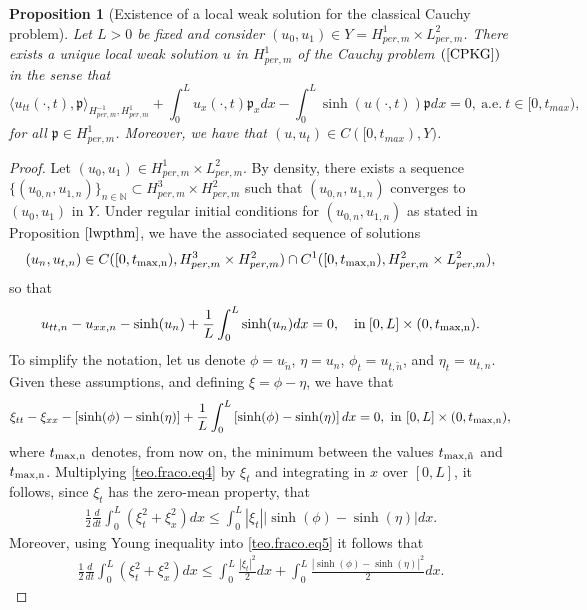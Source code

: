 \documentclass[12pt,reqno,a4paper]{amsart} %
\numberwithin{equation}{section}
\numberwithin{figure}{section}
\newtheorem{proposition}[theorem]{Proposition}
\begin{document}
\begin{proposition}[Existence of a local weak solution for the classical Cauchy problem]\label{lwpthm2}	
	Let $L>0$ be fixed and consider $(u_0,u_1)\in Y=H_{per,m}^1\times L_{per,m}^2$. There exists a unique local weak solution $u$ in $H_{per,m}^1$ of the Cauchy problem $(\ref{CPKG})$ in the sense that 
	\begin{equation}\label{weaksol}
	\displaystyle	\langle u_{tt}(\cdot,t), \mathfrak{p}	\displaystyle\rangle_{H^{-1}_{per,m},H_{per,m}^1} + \int_{0}^{L} u_x(\cdot,t)\mathfrak{p}_xdx - \int_{0}^{L} \sinh(u(\cdot,t))\mathfrak{p}dx = 0, \ \text{a.e.} \ t \in [0,t_{max}),
	\end{equation}for all $\mathfrak{p}\in H_{per,m}^1$. Moreover, we have that $(u,u_t)\in C([0,t_{max}),Y)$.
\end{proposition}
\begin{proof} Let $(u_0,u_1)\in H_{per,m}^1\times L_{per,m}^2$. By density, there exists a sequence $\{ (u_{0,n},u_{1,n})\}_{n\in\mathbb{N}} \subset H_{per,m}^3\times H_{per,m}^2$ such that
$(u_{0,n},u_{1,n})$ converges to $ (u_0,u_1)  $ in $Y$. Under regular initial conditions for $(u_{0,n},u_{1,n})$ as stated in Proposition $\ref{lwpthm}$, we have the associated sequence of solutions 
\begin{align} \label{teo.fraco.eq1}
	(u_n, u_{t,n})\in  C([0,t_{\rm{max,n}}),H_{per,m}^3\times H_{per,m}^2)\cap C^1([0,t_{\rm{max,n}}),H_{per,m}^2\times L_{per,m}^2),
\end{align}so that 
\begin{align} \label{teo.fraco.eq2}
	u_{tt,n}-u_{xx,n}-\sinh (u_n)+\frac{1}{L}\int_0^L\sinh(u_n)dx=0,  \quad  {\rm{in}} \: [0,L]\times(0,t_{\rm{max,n}}).
\end{align}
To simplify the notation, let us denote $\phi=u_{\tilde{n}}$, $\eta=u_n$, $\phi_t=u_{t,{\tilde{n}}}$, and $\eta_t=u_{t,n}$. Given these assumptions, and defining $\xi=\phi-\eta$, we have that
\begin{align} \label{teo.fraco.eq4}
	\xi_{tt}-\xi_{xx}-[\sinh(\phi)-\sinh(\eta)]+\frac{1}{L}\int_0^L\left[\sinh(\phi)-\sinh(\eta)\right]dx=0,\  {\rm in}\ [0,L]\times  (0,t_{\rm{max, n}}),
\end{align}where $t_{\rm{max,n}}$ denotes, from now on, the minimum between the values $t_{\rm{max,{\tilde{n}}}}$ and $ t_{\rm{max,n}}$. Multiplying \eqref{teo.fraco.eq4} by $\xi_t$ and integrating in $x$ over $[0,L]$, it follows, since $\xi_t$ has the zero-mean property, that
\begin{align} \label{teo.fraco.eq5}
\frac{1}{2}\frac{d}{dt}	\displaystyle\int_0^L(\xi_t^2+\xi_x^2)dx\leq \int_0^L|\xi_t||\sinh(\phi)-\sinh(\eta)|dx.
\end{align}
 Moreover, using Young inequality into \eqref{teo.fraco.eq5} it follows that 
 \begin{align} \label{teo.fraco.eq5'}
 	\frac{1}{2}\frac{d}{dt}	\displaystyle\int_0^L(\xi_t^2+\xi_x^2)dx\leq \int_0^L\frac{|\xi_t|^2}{2}dx+\int_0^L\frac{|\sinh(\phi)-\sinh(\eta)|^2}{2}dx.
\end{align}


\end{proof}
\end{document}
